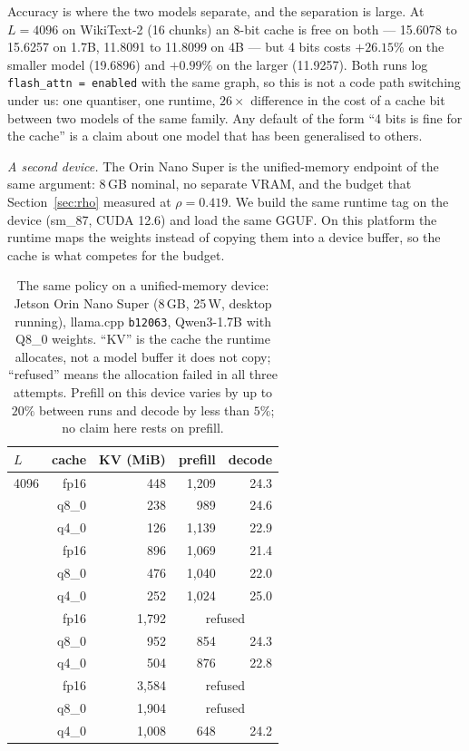 \documentclass[5p]{elsarticle}
\begin{document}
Accuracy is where the two models separate, and the separation is large. At
$L{=}4096$ on WikiText-2 (16 chunks) an 8-bit cache is free on both --- 15.6078 to
15.6257 on 1.7B, 11.8091 to 11.8099 on 4B --- but 4 bits costs $+26.15\%$ on the
smaller model (19.6896) and $+0.99\%$ on the larger (11.9257). Both runs log
\texttt{flash\_attn = enabled} with the same graph, so this is not a code path
switching under us: one quantiser, one runtime, $26\times$ difference in the cost
of a cache bit between two models of the same family. Any default of the form
``4 bits is fine for the cache'' is a claim about one model that has been
generalised to others.

\emph{A second device.} The Orin Nano Super is the unified-memory endpoint of the
same argument: 8\,GB nominal, no separate VRAM, and the budget that
Section~\ref{sec:rho} measured at $\rho=0.419$. We build the same runtime tag on
the device (sm\_87, CUDA 12.6) and load the same GGUF. On this platform the runtime
maps the weights instead of copying them into a device buffer, so the cache is what
competes for the budget.

\begin{table}[t]
\caption{The same policy on a unified-memory device: Jetson Orin Nano Super
(8\,GB, 25\,W, desktop running), llama.cpp \texttt{b12063}, Qwen3-1.7B with Q8\_0
weights. ``KV'' is the cache the runtime allocates, not a model buffer it does not
copy; ``refused'' means the allocation failed in all three attempts. Prefill on
this device varies by up to $20\%$ between runs and decode by less than $5\%$; no
claim here rests on prefill.}
\label{tab:exec-orin}
\begin{tabular}{@{}lrrrr@{}}
\toprule
$L$ & cache & KV (MiB) & prefill & decode \\
\midrule
4096  & fp16  &   448 & 1{,}209 & 24.3 \\
      & q8\_0 &   238 &   989 & 24.6 \\
      & q4\_0 &   126 & 1{,}139 & 22.9 \\
\addlinespace
8192  & fp16  &   896 & 1{,}069 & 21.4 \\
      & q8\_0 &   476 & 1{,}040 & 22.0 \\
      & q4\_0 &   252 & 1{,}024 & 25.0 \\
\addlinespace
16384 & fp16  & 1{,}792 & \multicolumn{2}{c}{refused} \\
      & q8\_0 &   952 &   854 & 24.3 \\
      & q4\_0 &   504 &   876 & 22.8 \\
\addlinespace
32768 & fp16  & 3{,}584 & \multicolumn{2}{c}{refused} \\
      & q8\_0 & 1{,}904 & \multicolumn{2}{c}{refused} \\
      & q4\_0 & 1{,}008 &   648 & 24.2 \\
\bottomrule
\end{tabular}
\end{table}
\end{document}
